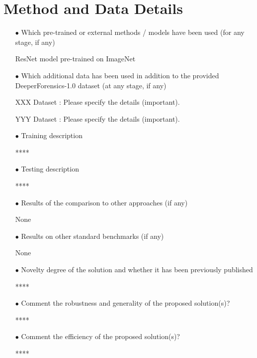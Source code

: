 \documentclass[runningheads]{llncs}
\begin{document}
\section{Method and Data Details}
\begin{spacing}{1.5}
\begin{itemize}

\item[$\bullet$] Which pre-trained or external methods / models have been used (for any stage, if any)

ResNet model pre-trained on ImageNet

\item[$\bullet$] Which additional data has been used in addition to the provided DeeperForensics-1.0 dataset (at any stage, if any)

XXX Dataset \cite{Alpher02}: Please specify the details (important).

YYY Dataset \cite{Alpher03}: Please specify the details (important).

\item[$\bullet$] Training description

****

\item[$\bullet$] Testing description

****

\item[$\bullet$] Results of the comparison to other approaches (if any)

None

\item[$\bullet$] Results on other standard benchmarks (if any)

None

\item[$\bullet$] Novelty degree of the solution and whether it has been previously published

****

\item[$\bullet$] Comment the robustness and generality of the proposed solution(s)?

**** 

\item[$\bullet$] Comment the efficiency of the proposed solution(s)?

****

\end{itemize}
\end{spacing}
\end{document}
